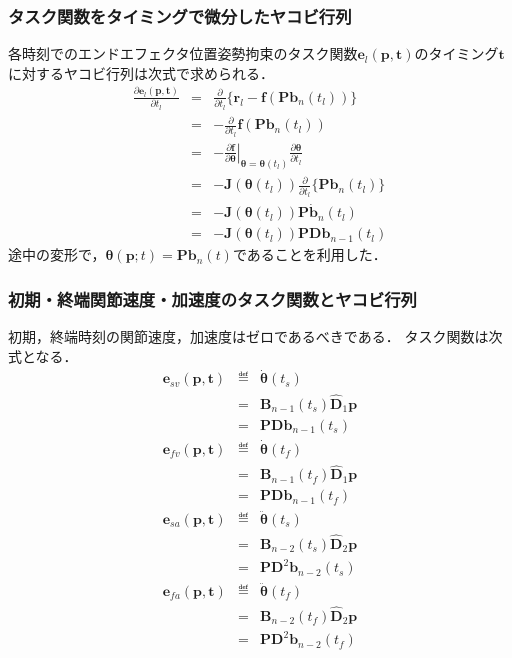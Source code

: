 \subsubsection*{タスク関数をタイミングで微分したヤコビ行列}

各時刻でのエンドエフェクタ位置姿勢拘束のタスク関数$\bm{e}_l(\bm{p}, \bm{t})$のタイミング$\bm{t}$に対するヤコビ行列は次式で求められる．
\begin{eqnarray}
  \frac{\partial \bm{e}_l(\bm{p}, \bm{t})}{\partial t_l} &=& \frac{\partial}{\partial t_l} \{ \bm{r}_l - \bm{f}(\bm{P}\bm{b}_n(t_l)) \} \\
  &=& - \frac{\partial}{\partial t_l} \bm{f}(\bm{P}\bm{b}_n(t_l)) \\
  &=& - \left. \frac{\partial \bm{f}}{\partial \bm{\theta}} \right|_{\bm{\theta} = \bm{\theta}(t_l)} \frac{\partial \bm{\theta}}{\partial t_l} \\
  &=& - \bm{J}(\bm{\theta}(t_l)) \frac{\partial}{\partial t_l} \{ \bm{P}\bm{b}_n(t_l) \} \\
  &=& - \bm{J}(\bm{\theta}(t_l)) \bm{P} \bm{\dot{b}}_n(t_l) \\
  &=& - \bm{J}(\bm{\theta}(t_l)) \bm{P} \bm{D} \bm{b}_{n-1}(t_l) \label{eq:bspline-task-jacobian-with-timing}
\end{eqnarray}
途中の変形で，$\bm{\theta}(\bm{p}; t) = \bm{P} \bm{b}_n(t)$であることを利用した．

\subsubsection*{初期・終端関節速度・加速度のタスク関数とヤコビ行列}

初期，終端時刻の関節速度，加速度はゼロであるべきである．
タスク関数は次式となる．
\begin{eqnarray}
  \bm{e}_{sv}(\bm{p}, \bm{t})
  &\eqdef& \bm{\dot{\theta}}(t_s) \\
  &=& \bm{B}_{n-1}(t_s) \bm{\hat{D}}_1 \bm{p} \\
  &=& \bm{P} \bm{D} \bm{b}_{n-1}(t_s) \\
  \bm{e}_{fv}(\bm{p}, \bm{t})
  &\eqdef& \bm{\dot{\theta}}(t_f) \\
  &=& \bm{B}_{n-1}(t_f) \bm{\hat{D}}_1 \bm{p} \\
  &=& \bm{P} \bm{D} \bm{b}_{n-1}(t_f) \\
  \bm{e}_{sa}(\bm{p}, \bm{t})
  &\eqdef& \bm{\ddot{\theta}}(t_s) \\
  &=& \bm{B}_{n-2}(t_s) \bm{\hat{D}}_2 \bm{p} \\
  &=& \bm{P} \bm{D}^2 \bm{b}_{n-2}(t_s) \\
  \bm{e}_{fa}(\bm{p}, \bm{t})
  &\eqdef& \bm{\ddot{\theta}}(t_f) \\
  &=& \bm{B}_{n-2}(t_f) \bm{\hat{D}}_2 \bm{p} \\
  &=& \bm{P} \bm{D}^2 \bm{b}_{n-2}(t_f)
\end{eqnarray}

